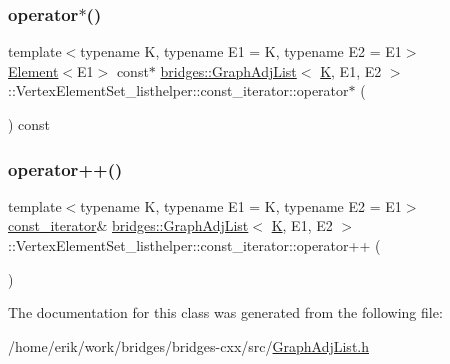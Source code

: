 \subsubsection{\texorpdfstring{operator$\ast$()}{operator*()}}
{\footnotesize\ttfamily template$<$typename K, typename E1 = K, typename E2 = E1$>$ \\
\hyperlink{classbridges_1_1_element}{Element}$<$E1$>$ const$\ast$ \hyperlink{classbridges_1_1_graph_adj_list}{bridges\+::\+Graph\+Adj\+List}$<$ \hyperlink{namespacebridges_acfb0a4f7877d8f63de3e6862004c50edaa5f3c6a11b03839d46af9fb43c97c188}{K}, E1, E2 $>$\+::Vertex\+Element\+Set\+\_\+listhelper\+::const\+\_\+iterator\+::operator$\ast$ (\begin{DoxyParamCaption}{ }\end{DoxyParamCaption}) const\hspace{0.3cm}{\ttfamily [inline]}}

\mbox{\label{classbridges_1_1_graph_adj_list_1_1_vertex_element_set__listhelper_1_1const__iterator_a44523a95bdf756876509aef9fb79db73}} 
\subsubsection{\texorpdfstring{operator++()}{operator++()}}
{\footnotesize\ttfamily template$<$typename K, typename E1 = K, typename E2 = E1$>$ \\
\hyperlink{classbridges_1_1_graph_adj_list_1_1_vertex_element_set__listhelper_1_1const__iterator}{const\+\_\+iterator}\& \hyperlink{classbridges_1_1_graph_adj_list}{bridges\+::\+Graph\+Adj\+List}$<$ \hyperlink{namespacebridges_acfb0a4f7877d8f63de3e6862004c50edaa5f3c6a11b03839d46af9fb43c97c188}{K}, E1, E2 $>$\+::Vertex\+Element\+Set\+\_\+listhelper\+::const\+\_\+iterator\+::operator++ (\begin{DoxyParamCaption}{ }\end{DoxyParamCaption})\hspace{0.3cm}{\ttfamily [inline]}}



The documentation for this class was generated from the following file\+:\begin{DoxyCompactItemize}
\item 
/home/erik/work/bridges/bridges-\/cxx/src/\hyperlink{_graph_adj_list_8h}{Graph\+Adj\+List.\+h}\end{DoxyCompactItemize}

